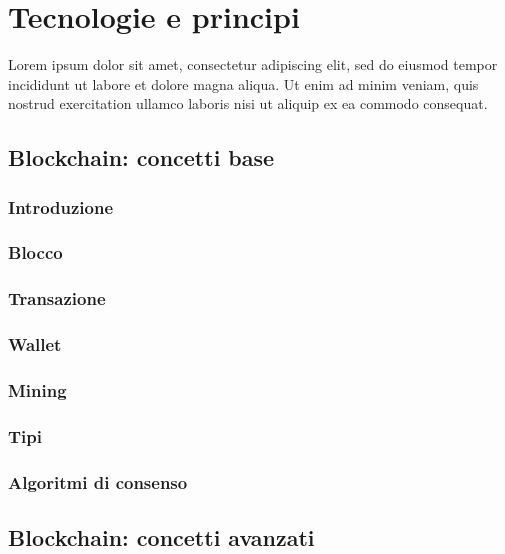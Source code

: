 \chapter{Tecnologie e principi}\label{cap:tecnologie-principi}

Lorem ipsum dolor sit amet, consectetur adipiscing elit, sed do eiusmod tempor 
incididunt ut labore et dolore magna aliqua. Ut enim ad minim veniam, quis nostrud exercitation ullamco 
laboris nisi ut aliquip ex ea commodo consequat. 

\section{Blockchain: concetti base}\label{sec:tecnologie-blockchain}

\subsection{Introduzione}\label{sec:tecnologie-blockchain-introduzione}
\subsection{Blocco}\label{sec:tecnologie-blockchain-blocco}
\subsection{Transazione}\label{sec:tecnologie-blockchain-transazione}
\subsection{Wallet}\label{sec:tecnologie-blockchain-wallet}
\subsection{Mining}\label{sec:tecnologie-blockchain-mining}
\subsection{Tipi}\label{sec:tecnologie-blockchain-tipi}
\subsection{Algoritmi di consenso}\label{sec:tecnologie-blockchain-algoritmi}

\section{Blockchain: concetti avanzati}\label{sec:tecnologie-blockchain-avanzate}
